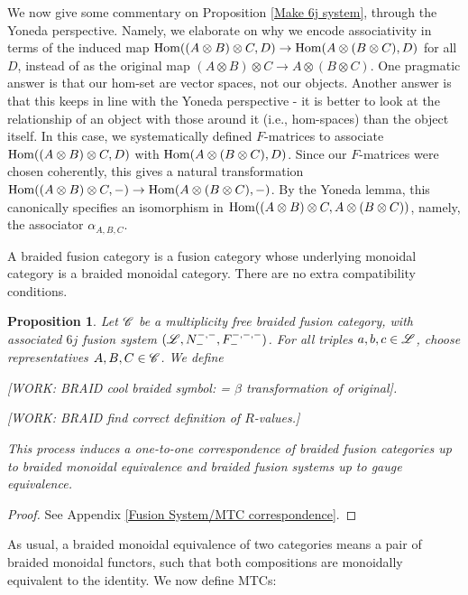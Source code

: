 \documentclass{article}
\newtheorem{proposition}{Proposition}[section]
\theoremstyle{definition}
\numberwithin{figure}{section}
\begin{document}
We now give some commentary on Proposition \ref{Make 6j system}, through the Yoneda perspective. Namely, we elaborate on why we encode associativity in terms of the induced map $\mathrm{Hom}((A\otimes B)\otimes C,D)\to \mathrm{Hom}(A\otimes (B\otimes C),D)$ for all $D$, instead of as the original map $(A\otimes B)\otimes C\to A\otimes (B\otimes C)$. One pragmatic answer is that our hom-set are vector spaces, not our objects. Another answer is that this keeps in line with the Yoneda perspective - it is better to look at the relationship of an object with those around it (i.e., hom-spaces) than the object itself. In this case, we systematically defined $F$-matrices to associate $\mathrm{Hom}((A\otimes B)\otimes C,D)$ with $\mathrm{Hom}(A\otimes (B\otimes C),D)$. Since our $F$-matrices were chosen coherently, this gives a natural transformation $\mathrm{Hom}((A\otimes B)\otimes C,\--)\to\mathrm{Hom}(A\otimes (B\otimes C),\--)$. By the Yoneda lemma, this canonically specifies an isomorphism in $\mathrm{Hom}((A\otimes B)\otimes C,A\otimes (B\otimes C))$, namely, the associator $\alpha_{A,B,C}$.

A braided fusion category is a fusion category whose underlying monoidal category is a braided monoidal category. There are no extra compatibility conditions.

\begin{proposition}\label{Make braided system} Let $\mathscr{C}$ be a multiplicity free braided fusion category, with associated $6j$ fusion system $(\mathscr{L},N^{\--,\--}_{\--},F^{\--,\--,\--}_{\--})$. For all triples $a,b,c\in \mathscr{L}$, choose representatives $A,B,C\in \mathscr{C}$. We define

[WORK: BRAID cool braided symbol: = $\beta$ transformation of original].

[WORK: BRAID find correct definition of $R$-values.]

This process induces a one-to-one correspondence of braided fusion categories up to braided monoidal equivalence and braided fusion systems up to gauge equivalence.
\end{proposition}
\begin{proof} See Appendix \ref{Fusion System/MTC correspondence}.
\end{proof}

As usual, a braided monoidal equivalence of two categories means a pair of braided monoidal functors, such that both compositions are monoidally equivalent to the identity. We now define MTCs:
\end{document}
